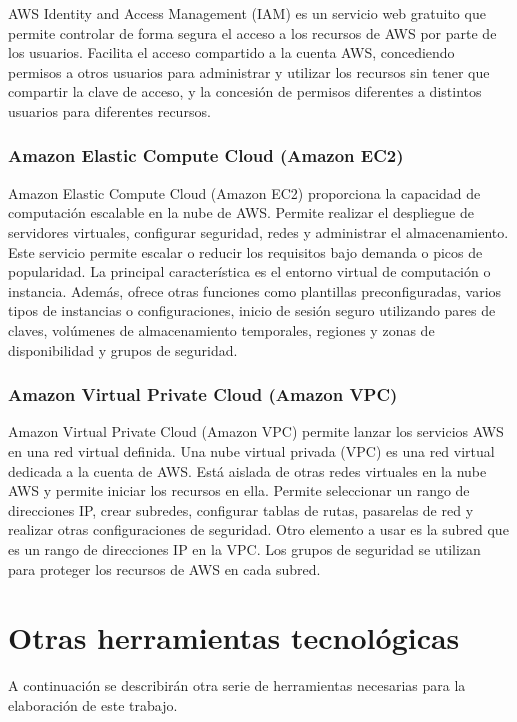 AWS Identity and Access Management (IAM)\cite{iam} es un servicio web gratuito que permite controlar de forma segura el acceso a los recursos de AWS por parte de los usuarios. Facilita el acceso compartido a la cuenta AWS, concediendo permisos a otros usuarios para administrar y utilizar los recursos sin tener que compartir la clave de acceso, y la concesión de permisos diferentes a distintos usuarios para diferentes recursos.

\subsubsection{Amazon Elastic Compute Cloud (Amazon EC2)}

Amazon Elastic Compute Cloud (Amazon EC2)\cite{ec2} proporciona la capacidad de computación escalable en la nube de AWS. Permite realizar el despliegue de servidores virtuales, configurar seguridad, redes y administrar el almacenamiento. Este servicio permite escalar o reducir los requisitos bajo demanda o picos de popularidad. La principal característica es el entorno virtual de computación o instancia. Además, ofrece otras funciones como plantillas preconfiguradas, varios tipos de instancias o configuraciones, inicio de sesión seguro utilizando pares de claves, volúmenes de almacenamiento temporales, regiones y zonas de disponibilidad y grupos de seguridad.

\subsubsection{Amazon Virtual Private Cloud (Amazon VPC)}

Amazon Virtual Private Cloud (Amazon VPC)\cite{vpc} permite lanzar los servicios AWS en una red virtual definida. Una nube virtual privada (VPC) es una red virtual dedicada a la cuenta de AWS. Está aislada de otras redes virtuales en la nube AWS y permite iniciar los recursos en ella. Permite seleccionar un rango de direcciones IP, crear subredes, configurar tablas de rutas, pasarelas de red y realizar otras configuraciones de seguridad. Otro elemento a usar es la subred que es un rango de direcciones IP en la VPC. Los grupos de seguridad se utilizan para proteger los recursos de AWS en cada subred.


\section{Otras herramientas tecnológicas}

A continuación se describirán otra serie de herramientas necesarias para la elaboración de este trabajo.

